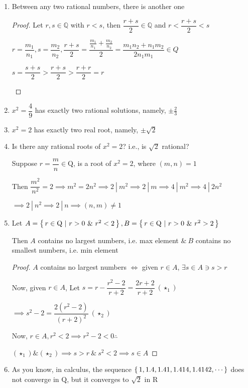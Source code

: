  \newpage

\begin{ex*} $ $
	\begin{enumerate}
		\item Between any two rational numbers, there is another one
		
		\begin{proof}
			Let $r,s \in \mathbb{Q}$ with $r<s$, then $\dfrac{r+s}{2} \in \mathbb{Q}$ and $r < \dfrac{r+s}{2} < s$
			
			\begin{tcolorbox}
				$r = \dfrac{m_1}{n_1}, s = \dfrac{m_2}{n_2}, \dfrac{r+s}{2} = \dfrac{\frac{m_1}{n_1}+\frac{m_2}{n_2}}{{2}} = \dfrac{m_1n_2 + n_1m_2}{2n_1m_1} 
				\in Q$
				
				$s = \dfrac{s+s}{2} > \dfrac{r + s}{2} > \dfrac{r+r}{2} = r$
			\end{tcolorbox}
		\end{proof}
		
		\item $x^2 = \dfrac{4}{9}$ has exactly two rational solutions, namely, $\pm \frac{2}{3}$
		\item $x^2 = 2$ has exactly two real root, namely, $\pm \sqrt{2}$
		\item Is there any rational roots of $x^2 = 2$? i.e., is $\sqrt{2}$ rational?
		\begin{tcolorbox}
			Suppose $r = \dfrac{m}{n} \in \mathrm{Q}$, is a root of $x^2 = 2$, where $(m,n) = 1$
			
			Then $\dfrac{m^2}{n^2} = 2 \implies m^2 = 2n^2 \implies 2~|~m^2 \implies 2~|~m \implies 4~|~m^2 \implies 4~|~2n^2$
			
			$\implies 2 ~|~ n^2 \implies 2 ~|~ n \implies (n,m) \neq 1$
		\end{tcolorbox}
		\item Let $A = \left\{ \,r \in \mathrm{Q}~|~r > 0 ~\& ~r^2 < 2 \,\right\}, B = \left\{ \,r \in \mathrm{Q}~|~r>0 ~\& ~r^2 > 2 \,\right\}$
		
		Then $A$ contains no largest numbers, i.e. max element $\& ~B$ contains no smallest numbers, i.e. min element
		\begin{tcolorbox}
			\begin{proof}
				$A$ contains no largest numbers $\Leftrightarrow$ given $r \in A$, $\exists s \in A \ni s>r$
				
				Now, given $r \in A$, Let $s = r - \dfrac{r^2 - 2}{r+2} = \dfrac{2r + 2}{r+2} ~(\star_1)$
				
				$\implies s^2 - 2 = \dfrac{2(r^2 - 2)}{(r+2)^2} ~(\star_2)$
				
				Now, $r \in A, r^2 < 2 \implies r^2-2 <0 \therefore $
				
				$(\star_1)\&(\star_2) \implies s > r ~\& ~s^2 < 2 \implies s \in A$
			\end{proof}
		\end{tcolorbox}
		\item As you know, in calculus, the sequence $\left\{ \,1,1.4,1.41,1.414,1.4142,\cdots \,\right\}$ does not converge in $\mathrm{Q}$, but it converges to $\sqrt{2}$ in $\mathrm{R}$
	\end{enumerate}
\end{ex*}

